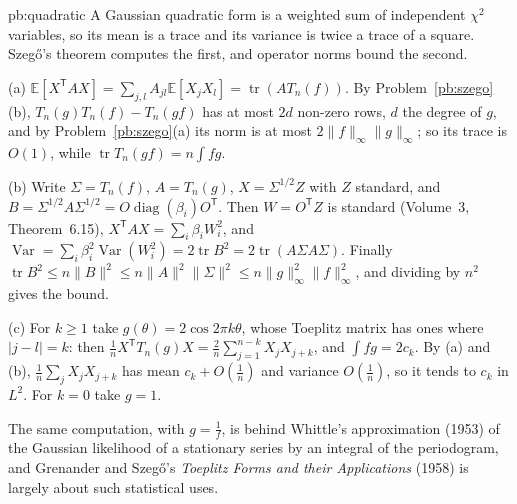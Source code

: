 \begin{solution}{pb:quadratic}
\idea A Gaussian quadratic form is a weighted sum of independent $\chi^2$ variables, so its mean is a trace and its variance is twice a trace of a square. Szegő's theorem computes the first, and
operator norms bound the second.

\writeup (a) $\mathbb E[X^{\mathsf T}AX]=\sum_{j,l}A_{jl}\mathbb E[X_jX_l]=\operatorname{tr}(AT_n(f))$. By Problem~\ref{pb:szego}(b), $T_n(g)T_n(f)-T_n(gf)$ has at most $2d$ non-zero rows, $d$ the degree of $g$,
and by Problem~\ref{pb:szego}(a) its norm is at most $2\|f\|_\infty\|g\|_\infty$; so its trace is $O(1)$, while $\operatorname{tr}T_n(gf)=n\int fg$.

(b) Write $\Sigma=T_n(f)$, $A=T_n(g)$, $X=\Sigma^{1/2}Z$ with $Z$ standard, and $B=\Sigma^{1/2}A\Sigma^{1/2}=O\operatorname{diag}(\beta_i)O^{\mathsf T}$. Then $W=O^{\mathsf T}Z$ is standard (Volume~3, Theorem~6.15),
$X^{\mathsf T}AX=\sum_i\beta_iW_i^2$, and $\operatorname{Var}=\sum_i\beta_i^2\operatorname{Var}(W_i^2)=2\operatorname{tr}B^2=2\operatorname{tr}(A\Sigma A\Sigma)$. Finally
$\operatorname{tr}B^2\le n\|B\|^2\le n\|A\|^2\|\Sigma\|^2\le n\|g\|_\infty^2\|f\|_\infty^2$, and dividing by $n^2$ gives the bound.

(c) For $k\ge1$ take $g(\theta)=2\cos2\pi k\theta$, whose Toeplitz matrix has ones where $|j-l|=k$: then $\frac1nX^{\mathsf T}T_n(g)X=\frac2n\sum_{j=1}^{n-k}X_jX_{j+k}$, and $\int fg=2c_k$. By (a) and (b),
$\frac1n\sum_jX_jX_{j+k}$ has mean $c_k+O(\frac1n)$ and variance $O(\frac1n)$, so it tends to $c_k$ in $L^2$. For $k=0$ take $g=1$.

\leads The same computation, with $g=\frac1f$, is behind Whittle's approximation (1953) of the Gaussian likelihood of a stationary series by an integral of the periodogram, and Grenander and
Szegő's \emph{Toeplitz Forms and their Applications} (1958) is largely about such statistical uses.
\end{solution}

